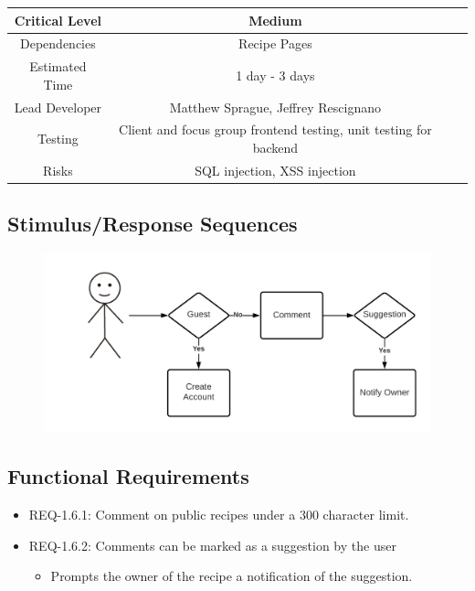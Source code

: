 \documentclass{scrreprt}
\begin{document}
\begin{center}
    \begin{tabular}{| c | c | c | c |}
        \hline
        Critical Level & Medium                                                            \\
        \hline
        Dependencies   & Recipe Pages                                                      \\
        \hline
        Estimated Time & 1 day - 3 days                                                    \\
        \hline
        Lead Developer & Matthew Sprague, Jeffrey Rescignano                               \\
        \hline
        Testing        & Client and focus group frontend testing, unit testing for backend \\
        \hline
        Risks          & SQL injection, XSS injection                                      \\
        \hline
    \end{tabular}
\end{center}

\subsection{Stimulus/Response Sequences}

\begin{figure}[H]\centering
    \includegraphics[width=\columnwidth]{FlowCharts/Recipe-Commenting.png}
\end{figure}

\subsection{Functional Requirements}

\begin{itemize}
    \item REQ-1.6.1: Comment on public recipes under a 300 character limit.
    \item REQ-1.6.2: Comments can be marked as a suggestion by the user
          \begin{itemize}
              \item Prompts the owner of the recipe a notification of the suggestion.
          \end{itemize}
\end{itemize}
\end{document}
